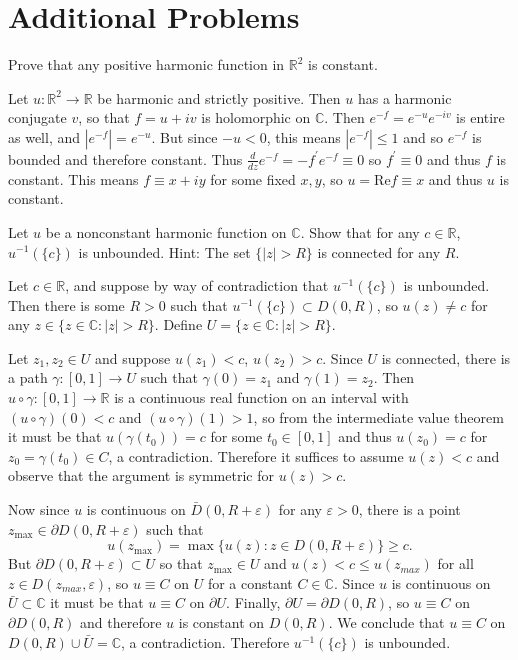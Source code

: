 \documentclass{article}
\newcounter{Problem}
\newenvironment{Problem}{\begin{Exercise}[name={Problem},
                                          counter={Problem}]}
                        {\end{Exercise}}
\begin{document}
\section{Additional Problems}
\begin{Problem}
Prove that any positive harmonic function in $\mathbb{R}^2$ is constant.
\end{Problem}

\begin{Answer}
Let $u : \mathbb{R}^2 \to \mathbb{R}$ be harmonic and strictly
positive. Then $u$ has a harmonic conjugate $v$, so that
$f = u + i v$ is holomorphic on $\mathbb{C}$. Then
$e^{-f} = e^{-u} e^{-iv}$ is entire as well, and $|e^{-f}| = e^{-u}$.
But since $-u < 0$, this means $|e^{-f}| \leq 1$ and so $e^{-f}$
is bounded and therefore constant. Thus
$\frac{d}{dz} e^{-f} = -f^\prime e^{-f} \equiv 0$  so $f^\prime \equiv
0$ and thus $f$ is constant. This means $f \equiv x + i y$ for some
fixed $x, y$, so $u = \mathrm{Re} f \equiv x$ and thus $u$ is constant.
\end{Answer}

\begin{Problem}
Let $u$ be a nonconstant harmonic function on $\mathbb{C}$. Show that
for any $c \in \mathbb{R}$, $u^{-1}(\{ c \})$ is unbounded.
Hint: The set $\{ |z| > R \}$ is connected for any $R$.
\end{Problem}

\begin{Answer}
Let $c \in \mathbb{R}$, and suppose by way of contradiction that
$u^{-1}(\{ c \})$ is unbounded. Then there is some $R > 0$ such that
$u^{-1}(\{ c \}) \subset D(0, R)$, so $u(z) \neq c$ for any
$z \in \{ z \in \mathbb{C} : |z| > R \}$. Define
$U = \{ z \in \mathbb{C} : |z| > R \}$.

Let $z_1, z_2 \in U$ and suppose $u(z_1) < c$, $u(z_2) > c$.
Since $U$ is connected, there is a path
$\gamma : [0, 1] \to U$ such that $\gamma(0) = z_1$ and
$\gamma(1) = z_2$. Then
$u \circ \gamma : [0, 1] \to \mathbb{R}$ is a continuous
real function on an interval
with $(u \circ \gamma)(0) < c$ and
$(u \circ \gamma)(1) > 1$, so from the intermediate value
theorem it must be that $u(\gamma(t_0)) = c$ for some
$t_0 \in [0, 1]$ and thus
$u(z_0) = c$ for $z_0 = \gamma(t_0) \in C$, a contradiction.
Therefore it suffices to assume $u(z) < c$
and observe that the argument is symmetric for $u(z) > c$.

Now since $u$ is continuous on $\bar{D}(0, R + \varepsilon)$
for any $\varepsilon > 0$, there is a
point $z_{\max} \in \partial D(0, R + \varepsilon)$ such that
$$
u(z_{\max}) = \max\{ u(z) : z \in D(0, R + \varepsilon) \} \geq c.
$$
But $\partial D(0, R + \varepsilon) \subset U$ so that
$z_{\max} \in U$ and $u(z) < c \leq u(z_{max})$
for all $z \in D(z_{max}, \varepsilon)$, so $u \equiv C$ on 
$U$ for a constant $C \in \mathbb{C}$. Since $u$ is continuous on
$\bar{U} \subset \mathbb{C}$ it must be that $u \equiv C$ on
$\partial U$.
Finally, $\partial U = \partial D(0, R)$, so $u \equiv C$ on
$\partial D(0, R)$ and therefore $u$ is constant on $D(0, R)$.
We conclude that $u \equiv C$ on
$D(0, R) \cup \bar{U} = \mathbb{C}$, a contradiction.
Therefore $u^{-1}(\{ c \})$ is unbounded.
\end{Answer}
\end{document}
